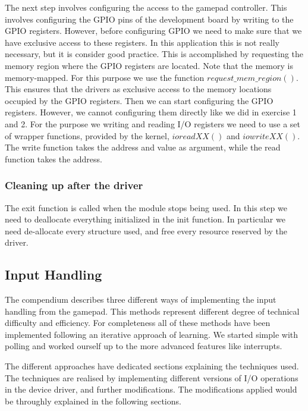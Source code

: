 The next step involves configuring the access to the gamepad controller. This involves configuring the GPIO pins of the development board by writing to the GPIO registers. However, before configuring GPIO we need to make sure that we have exclusive access to these registers. In this application this is not really necessary, but it is consider good practice. This is accomplished by requesting the memory region where the GPIO registers are located. Note that the memory is memory-mapped. For this purpose we use the function $request\_mem\_region()$. This ensures that the drivers as exclusive access to the memory locations occupied by the GPIO registers. Then we can start configuring the GPIO registers. However, we cannot configuring them directly like we did in exercise 1 and 2. For the purpose we writing and reading I/O registers we need to use a set of wrapper functions, provided by the kernel, $ioreadXX()$ and $iowriteXX()$. The write function takes the address and value as argument, while the read function takes the address. 



\subsubsection{Cleaning up after the driver}
The exit function is called when the module stops being used. In this step we need to deallocate everything initialized in the init function. In particular we need de-allocate every structure used, and free every resource reserved by the driver. 






\subsection{Input Handling}
The compendium describes three different ways of implementing the input handling from the gamepad. This methods represent different degree of technical difficulty and efficiency. For completeness all of these methods have been implemented following an iterative approach of learning. We started simple with polling and worked ourself up to the more advanced features like interrupts.

The different approaches have dedicated sections explaining the techniques used. The techniques are realised by implementing different versions of I/O operations in the device driver, and further modifications. The modifications applied would be throughly explained in the following sections. 


